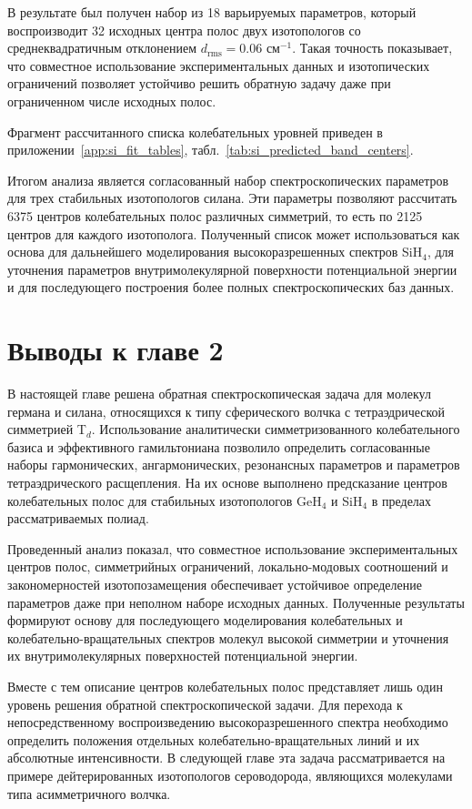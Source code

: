 В результате был получен набор из 18 варьируемых параметров, который воспроизводит 32 исходных центра
полос двух изотопологов со среднеквадратичным отклонением $d_{\textrm{rms}}=0.06$ см$^{-1}$. Такая точность
показывает, что совместное использование экспериментальных данных и изотопических ограничений
позволяет устойчиво решить обратную задачу даже при ограниченном числе исходных полос.

Фрагмент рассчитанного списка колебательных уровней приведен в
приложении~\ref{app:si_fit_tables}, табл.~\ref{tab:si_predicted_band_centers}.

Итогом анализа является согласованный набор спектроскопических параметров для трех стабильных 
изотопологов силана. Эти параметры позволяют рассчитать 6375 центров колебательных полос различных
симметрий, то есть по 2125 центров для каждого изотополога. Полученный список может использоваться как
основа для дальнейшего моделирования высокоразрешенных спектров SiH$_4$, для уточнения параметров
внутримолекулярной поверхности потенциальной энергии и для последующего построения более полных
спектроскопических баз данных.

\section*{Выводы к главе 2}

В настоящей главе решена обратная спектроскопическая задача для молекул германа и силана,
относящихся к типу сферического волчка с тетраэдрической симметрией T$_d$. Использование
аналитически симметризованного колебательного базиса и эффективного гамильтониана позволило
определить согласованные наборы гармонических, ангармонических, резонансных параметров и параметров
тетраэдрического расщепления. На их основе выполнено предсказание центров колебательных полос для
стабильных изотопологов GeH$_4$ и SiH$_4$ в пределах рассматриваемых полиад.

Проведенный анализ показал, что совместное использование экспериментальных центров полос,
симметрийных ограничений, локально-модовых соотношений и закономерностей изотопозамещения обеспечивает
устойчивое определение параметров даже при неполном наборе исходных данных. Полученные результаты
формируют основу для последующего моделирования колебательных и колебательно-вращательных спектров
молекул высокой симметрии и уточнения их внутримолекулярных поверхностей потенциальной энергии.

Вместе с тем описание центров колебательных полос представляет лишь один уровень решения обратной
спектроскопической задачи. Для перехода к непосредственному воспроизведению высокоразрешенного
спектра необходимо определить положения отдельных колебательно-вращательных линий и их абсолютные
интенсивности. В следующей главе эта задача рассматривается на примере дейтерированных изотопологов
сероводорода, являющихся молекулами типа асимметричного волчка.



